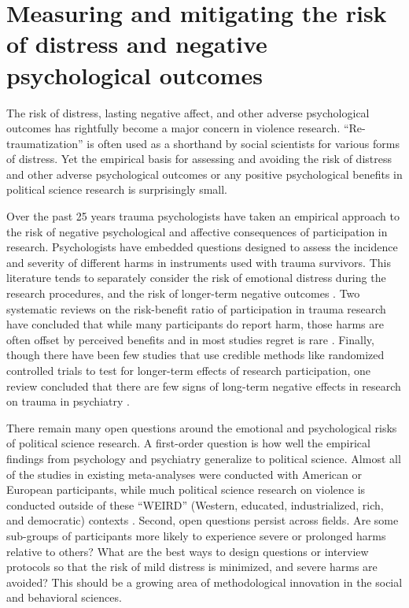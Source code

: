 \section{Measuring and mitigating the risk of distress and negative psychological outcomes}

The risk of distress, lasting negative affect, and other adverse psychological outcomes has rightfully become a major concern in violence research. ``Re-traumatization'' is often used as a shorthand by social scientists for various forms of distress. Yet the empirical basis for assessing and avoiding the risk of distress and other adverse psychological outcomes or any positive psychological benefits in political science research is surprisingly small.

Over the past 25 years trauma psychologists have taken an empirical approach to the risk of negative psychological and affective consequences of participation in research. Psychologists have embedded questions designed to assess the incidence and severity of different harms in instruments used with trauma survivors. This literature tends to separately consider the risk of emotional distress during the research procedures, and the risk of longer-term negative outcomes \citep{legerski2010risks}. Two systematic reviews on the risk-benefit ratio of participation in trauma research have concluded that while many participants do report harm, those harms are often offset by perceived benefits and in most studies regret is rare \citep{jaffe2015does, mcclinton2015adolescents}. Finally, though there have been few studies that use credible methods like randomized controlled trials to test for longer-term effects of research participation, one review concluded that there are few signs of long-term negative effects in research on trauma in psychiatry \citep{jorm2007participant}. 

There remain many open questions around the emotional and psychological risks of political science research. A first-order question is how well the empirical findings from psychology and psychiatry generalize to political science. Almost all of the studies in existing meta-analyses were conducted with American or European participants, while much political science research on violence is conducted outside of these ``WEIRD'' (Western, educated, industrialized, rich, and democratic) contexts \citep{henrich2010weirdest}. Second, open questions persist across fields. Are some sub-groups of participants more likely to experience severe or prolonged harms relative to others? What are the best ways to design questions or interview protocols so that the risk of mild distress is minimized, and severe harms are avoided? This should be a growing area of methodological innovation in the social and behavioral sciences. 

